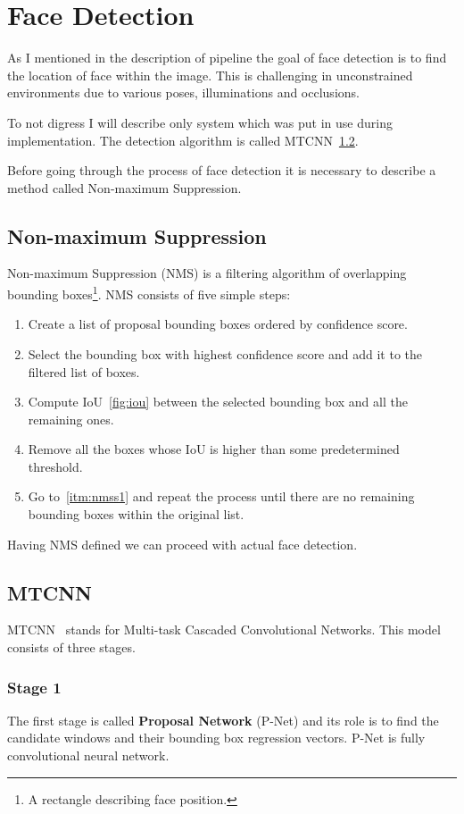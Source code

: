 \section{Face Detection}\label{sec:face-detection}
As I mentioned in the description of pipeline the goal of face detection is to find the location of face within the
image.
This is challenging in unconstrained environments due to various poses, illuminations and occlusions.

To not digress I will describe only system which was put in use during implementation.
The detection algorithm is called MTCNN~\ref{subsec:mtcnn}.

Before going through the process of face detection it is necessary to describe a method called Non-maximum Suppression.

\subsection{Non-maximum Suppression}\label{subsec:nms}
Non-maximum Suppression (NMS) is a filtering algorithm of overlapping bounding
boxes\footnote{\label{foot:bbox}A rectangle describing face position.}.
NMS consists of five simple steps:
\begin{enumerate}
    \item \label{itm:nmss1}Create a list of proposal bounding boxes ordered by confidence score.
    \item Select the bounding box with highest confidence score and add it to the filtered list of boxes.
    \item Compute IoU~\ref{fig:iou} between the selected bounding box and all the remaining ones.
    \item Remove all the boxes whose IoU is higher than some predetermined threshold.
    \item Go to~\ref{itm:nmss1} and repeat the process until there are no remaining bounding boxes within the original list.
\end{enumerate}

Having NMS defined we can proceed with actual face detection.

\subsection{MTCNN}\label{subsec:mtcnn}
MTCNN~\cite{MTCNN} stands for Multi-task Cascaded Convolutional Networks.
This model consists of three stages.

\subsubsection{Stage 1}
The first stage is called \textbf{Proposal Network} (P-Net) and its role is to find the candidate windows and their
bounding box regression vectors.
P-Net is fully convolutional neural network.

